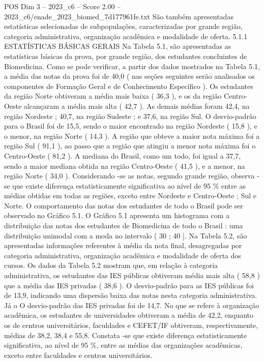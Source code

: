 \begin{textsample}{POS Dim 3 – 2023\_c6 – Score 2.00 – 2023\_c6/enade\_2023\_biomed\_7d177961fe.txt}
São também apresentadas estatísticas selecionadas de subpopulações, caracterizadas por grande região, categoria administrativa, organização acadêmica e modalidade de oferta. 5.1.1 ESTATÍSTICAS BÁSICAS GERAIS Na Tabela 5.1, são apresentadas as estatísticas básicas da prova, por grande região, dos estudantes concluintes de Biomedicina.
Como se pode verificar, a partir dos dados mostrados na Tabela 5.1, a média das notas da prova foi de 40,0 ( nas seções seguintes serão analisados os componentes de Formação Geral e de Conhecimento Específico ).
Os estudantes da região Norte obtiveram a média mais baixa ( 36,3 ), e os da região Centro-Oeste alcançaram a média mais alta ( 42,7 ).
As demais médias foram 42,4, na região Nordeste ; 40,7, na região Sudeste ; e 37,6, na região Sul.
O desvio-padrão para o Brasil foi de 15,5, sendo o maior encontrado na região Nordeste ( 15,8 ), e o menor, na região Norte ( 14,3 ).
A região que obteve a maior nota máxima foi a região Sul ( 91,1 ), ao passo que a região que atingiu a menor nota máxima foi o Centro-Oeste ( 81,2 ).
A mediana do Brasil, como um todo, foi igual a 37,7, sendo a maior mediana obtida na região Centro-Oeste ( 41,5 ), e a menor, na região Norte ( 34,0 ).
Considerando -se as notas, segundo grande região, observa -se que existe diferença estatisticamente significativa ao nível de 95 \% entre as médias obtidas em todas as regiões, exceto entre Nordeste e Centro-Oeste ; Sul e Norte.
O comportamento das notas dos estudantes de todo o Brasil pode ser observado no Gráfico 5.1.
O Gráfico 5.1 apresenta um histograma com a distribuição das notas dos estudantes de Biomedicina de todo o Brasil : uma distribuição unimodal com a moda no intervalo ( 30 ; 40 ].
Na Tabela 5.2, são apresentadas informações referentes à média da nota final, desagregadas por categoria administrativa, organização acadêmica e modalidade de oferta dos cursos.
Os dados da Tabela 5.2 mostram que, em relação à categoria administrativa, os estudantes das IES públicas obtiveram média mais alta ( 58,8 ) que a média das IES privadas ( 38,6 ).
O desvio-padrão para as IES públicas foi de 13,9, indicando uma dispersão baixa das notas nesta categoria administrativa.
Já o O desvio-padrão das IES privadas foi de 14,7.
No que se refere à organização acadêmica, os estudantes de universidades obtiveram a média de 42,2, enquanto os de centros universitários, faculdades e CEFET/IF obtiveram, respectivamente, médias de 38,2, 38,4 e 55,8.
Constata -se que existe diferença estatisticamente significativa, ao nível de 95 \%, entre as médias das organizações acadêmicas, exceto entre faculdades e centros universitários.

\end{textsample}
